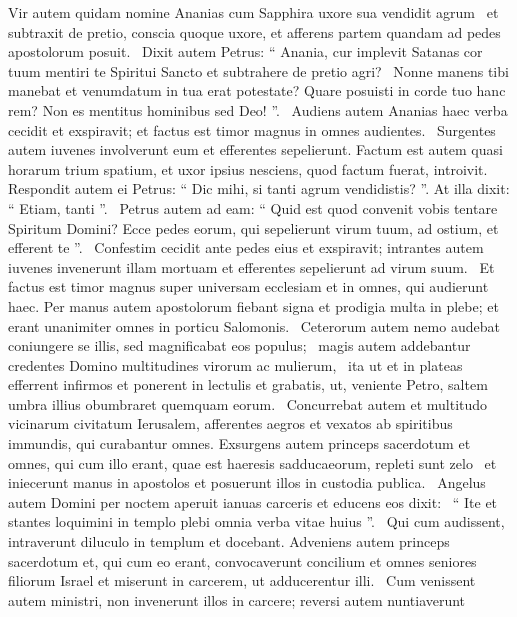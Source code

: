 \begin{biblechapter}
\begin{biblechapter}
\begin{biblechapter}
\begin{biblechapter}
\begin{biblechapter}
 \verse Vir autem quidam nomine Ananias cum Sapphira uxore sua vendidit agrum 
 \verse et subtraxit de pretio, conscia quoque uxore, et afferens partem quandam ad pedes apostolorum posuit. 
 \verse Dixit autem Petrus: “ Anania, cur implevit Satanas cor tuum mentiri te Spiritui Sancto et subtrahere de pretio agri? 
 \verse Nonne manens tibi manebat et venumdatum in tua erat potestate? Quare posuisti in corde tuo hanc rem? Non es mentitus hominibus sed Deo! ”. 
 \verse Audiens autem Ananias haec verba cecidit et exspiravit; et factus est timor magnus in omnes audientes. 
 \verse Surgentes autem iuvenes involverunt eum et efferentes sepelierunt.
 \verse Factum est autem quasi horarum trium spatium, et uxor ipsius nesciens, quod factum fuerat, introivit. 
 \verse Respondit autem ei Petrus: “ Dic mihi, si tanti agrum vendidistis? ”. At illa dixit: “ Etiam, tanti ”. 
 \verse Petrus autem ad eam: “ Quid est quod convenit vobis tentare Spiritum Domini? Ecce pedes eorum, qui sepelierunt virum tuum, ad ostium, et efferent te ”. 
 \verse Confestim cecidit ante pedes eius et exspiravit; intrantes autem iuvenes invenerunt illam mortuam et efferentes sepelierunt ad virum suum. 
 \verse Et factus est timor magnus super universam ecclesiam et in omnes, qui audierunt haec.
 \verse Per manus autem apostolorum fiebant signa et prodigia multa in plebe; et erant unanimiter omnes in porticu Salomonis. 
 \verse Ceterorum autem nemo audebat coniungere se illis, sed magnificabat eos populus; 
 \verse magis autem addebantur credentes Domino multitudines virorum ac mulierum, 
 \verse ita ut et in plateas efferrent infirmos et ponerent in lectulis et grabatis, ut, veniente Petro, saltem umbra illius obumbraret quemquam eorum. 
 \verse Concurrebat autem et multitudo vicinarum civitatum Ierusalem, afferentes aegros et vexatos ab spiritibus immundis, qui curabantur omnes.
 \verse Exsurgens autem princeps sacerdotum et omnes, qui cum illo erant, quae est haeresis sadducaeorum, repleti sunt zelo 
 \verse et iniecerunt manus in apostolos et posuerunt illos in custodia publica. 
 \verse Angelus autem Domini per noctem aperuit ianuas carceris et educens eos dixit: 
 \verse “ Ite et stantes loquimini in templo plebi omnia verba vitae huius ”. 
 \verse Qui cum audissent, intraverunt diluculo in templum et docebant.
 Adveniens autem princeps sacerdotum et, qui cum eo erant, convocaverunt concilium et omnes seniores filiorum Israel et miserunt in carcerem, ut adducerentur illi. 
 \verse Cum venissent autem ministri, non invenerunt illos in carcere; reversi autem nuntiaverunt 

\end{biblechapter}
\end{biblechapter}
\end{biblechapter}
\end{biblechapter}
\end{biblechapter}
